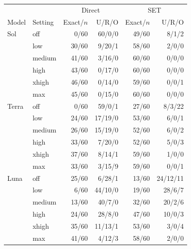 \begin{tabular}{@{}llrrrr@{}}
\toprule
&&\multicolumn{2}{c}{Direct}&\multicolumn{2}{c}{SET}\\
Model & Setting & Exact/$n$ & U/R/O & Exact/$n$ & U/R/O\\
\midrule
Sol & off & 0/60 & 60/0/0 & 49/60 & 8/1/2\\
 & low & 30/60 & 9/20/1 & 58/60 & 2/0/0\\
 & medium & 41/60 & 3/16/0 & 60/60 & 0/0/0\\
 & high & 43/60 & 0/17/0 & 60/60 & 0/0/0\\
 & xhigh & 46/60 & 0/14/0 & 59/60 & 0/0/1\\
 & max & 45/60 & 0/15/0 & 60/60 & 0/0/0\\
\midrule
Terra & off & 0/60 & 59/0/1 & 27/60 & 8/3/22\\
 & low & 24/60 & 17/19/0 & 53/60 & 6/0/1\\
 & medium & 26/60 & 15/19/0 & 52/60 & 6/0/2\\
 & high & 33/60 & 7/20/0 & 52/60 & 5/0/3\\
 & xhigh & 37/60 & 8/14/1 & 59/60 & 1/0/0\\
 & max & 33/60 & 3/15/9 & 59/60 & 0/0/1\\
\midrule
Luna & off & 25/60 & 6/28/1 & 13/60 & 24/12/11\\
 & low & 6/60 & 44/10/0 & 19/60 & 28/6/7\\
 & medium & 13/60 & 40/7/0 & 32/60 & 20/2/6\\
 & high & 24/60 & 28/8/0 & 47/60 & 10/0/3\\
 & xhigh & 35/60 & 11/13/1 & 53/60 & 3/0/4\\
 & max & 41/60 & 4/12/3 & 58/60 & 2/0/0\\
\bottomrule
\end{tabular}
